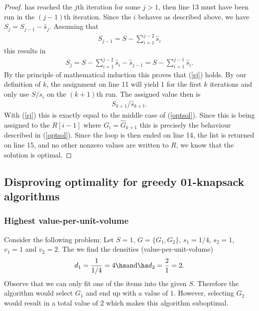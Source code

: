 \documentclass{article}
\begin{document}
\begin{proof}
    has reached the $j$th iteration for some $j>1$, then line 13 must have been run in the
    $(j-1)$th iteration. Since the $i$ behaves as described above, we have
    $S_j=S_{j-1}-\hat s_j$. Assuming that
    \begin{align*}
        S_{j-1} = S - \sum_{i=1}^{j-2} \hat s_i
    \end{align*}
    this results in
    \begin{align*}
        S_j = S - \sum_{i=1}^{j-2} \hat s_i - \hat s_{j-1} = S - \sum_{i=1}^{j-1} \hat s_i.
    \end{align*}
    By the principle of mathematical induction this proves that (\ref{sj}) holds.
    By our definition of $k$, the assignment on line 11 will yield 1 for the first $k$
    iterations and only use $S/s_i$ on the $(k+1)$th run. The assigned value then is 
    \begin{align*}
        S_{k+1}/\hat s_{k+1}.
    \end{align*}
    With (\ref{sj}) this is exactly equal to the middle case of (\ref{optsol}).
    Since this is being assigned to the $R[i-1]$ where $G_i = \hat G_{k+1}$ this
    is precisely the behaviour described in (\ref{optsol}).
    Since the loop is then ended on line 14, the list is returned on line 15,
    and no other nonzero values are written to $R$, 
    we know that the solution is optimal.
\end{proof}

\subsection{Disproving optimality for greedy 01-knapsack algorithms}

\subsubsection{Highest value-per-unit-volume}

Consider the following problem: Let $S=1$, $G=\{G_1, G_2\}$, $s_1=1/4$, $s_2=1$,
$v_1=1$ and $v_2=2$. The we find the densities (value-per-unit-volume)
\begin{align*}
    d_1 = \frac{1}{1/4} = 4 \hs\text{and}\hs d_2 =\frac{2}{1}=2.
\end{align*}
Observe that we can only fit one of the items into the given $S$.
Therefore the algorithm would select $G_1$ and end up with a value of $1$.
However, selecting $G_2$ would result in a total value of $2$ which makes
this algorithm suboptimal.
\end{document}
